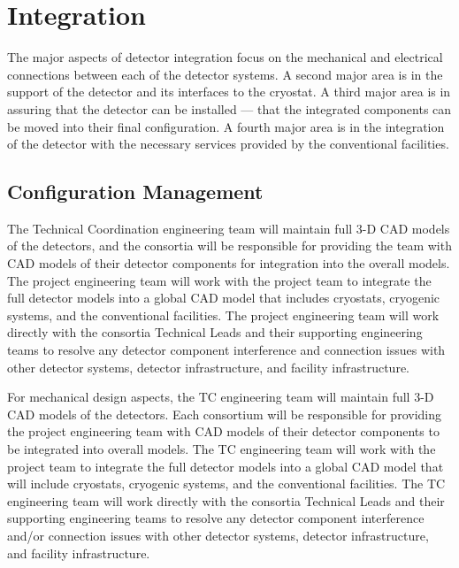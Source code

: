 \section{Integration}
\label{sec:fdsp-coord-integ-sysengr}

The major aspects of detector integration focus on the mechanical and
electrical connections between each of the detector systems. A second
major area is in the support of the detector and its interfaces to the
cryostat. A third major area is in assuring that the detector can be
installed --- that the integrated components can be moved into their
final configuration. A fourth major area is in the integration of the
detector with the necessary services provided by the conventional
facilities.

\subsection{Configuration Management}
\label{sec:fdsp-coord-integ-config}

The  Technical Coordination engineering team will maintain
full 3-D CAD models of the detectors, and the consortia will be
responsible for providing the team with CAD models of their detector
components for integration into the overall models.  The project
engineering team will work with the  project team to integrate the
full detector models into a global  CAD model that includes
cryostats, cryogenic systems, and the conventional facilities.  The
 project engineering team will work directly with the consortia
Technical Leads and their supporting engineering teams to resolve any
detector component interference and connection issues with other
detector systems, detector infrastructure, and facility
infrastructure.

For mechanical design aspects, the  TC 
engineering team will maintain full 3-D CAD models of the detectors.
Each consortium will be responsible for providing the project
engineering team with CAD models of their detector components to be
integrated into overall models.  The TC engineering team will
work with the  project team to integrate the full detector models
into a global  CAD model that will include cryostats, cryogenic
systems, and the conventional facilities.  The TC
engineering team will work directly with the consortia Technical Leads
and their supporting engineering teams to resolve any detector
component interference and/or connection issues with other detector
systems, detector infrastructure, and facility infrastructure.

